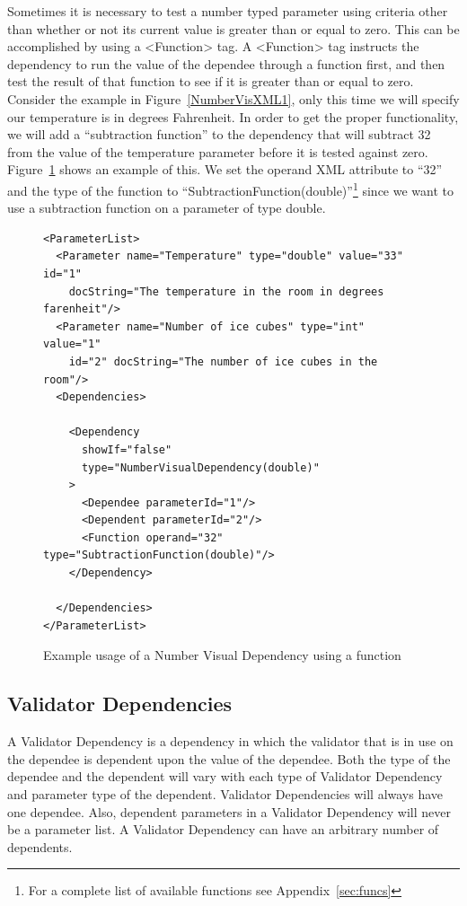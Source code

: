 Sometimes it is necessary to test a number typed parameter using criteria other than whether or not its current value is greater than or equal to zero.
This can be accomplished by using a <Function> tag. A <Function> tag instructs the dependency to run the value of the dependee through a function
first, and then test the result of that function to see if it is greater than or equal to zero. Consider the example in Figure~\ref{NumberVisXML1}, 
only this time we will specify our temperature is in degrees Fahrenheit. In order to get the proper functionality, we will add a 
``subtraction function'' to the dependency that will subtract 32 from the value of the temperature parameter before it is tested against zero. 
Figure~\ref{NumberVisXML2} shows an example of this. We set the operand XML attribute to ``32'' and the type of the function to 
``SubtractionFunction(double)''\footnote{For a complete list of available functions see Appendix~\ref{sec:funcs}}
 since we want to use a subtraction function on a parameter of type double.
\begin{figure}
\centering
{\footnotesize
\begin{Verbatim}
<ParameterList>
  <Parameter name="Temperature" type="double" value="33" id="1" 
    docString="The temperature in the room in degrees farenheit"/>
  <Parameter name="Number of ice cubes" type="int" value="1"
    id="2" docString="The number of ice cubes in the room"/>
  <Dependencies>

    <Dependency 
      showIf="false" 
      type="NumberVisualDependency(double)"
    >
      <Dependee parameterId="1"/>
      <Dependent parameterId="2"/>
      <Function operand="32" type="SubtractionFunction(double)"/> 
    </Dependency>

  </Dependencies>
</ParameterList>
\end{Verbatim}
}
\caption{Example usage of a Number Visual Dependency using a function}
\label{NumberVisXML2}
\end{figure}

\subsection{Validator Dependencies}
A Validator Dependency is a dependency in which the validator that is in use on the dependee is dependent upon the value of the dependee. Both the type of
the dependee and the dependent will vary with each type of Validator Dependency and parameter type of the dependent. Validator Dependencies will always have
one dependee. Also, dependent parameters in a Validator Dependency will never be a parameter list. A Validator Dependency can have an arbitrary number of 
dependents.

